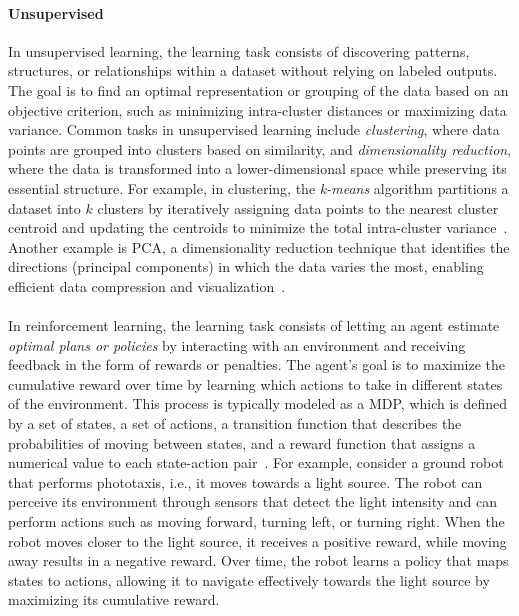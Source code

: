 \paragraph{Unsupervised}
%
In unsupervised learning, the learning task consists of discovering patterns, structures, or relationships within a dataset without relying on labeled outputs.
%
The goal is to find an optimal representation or grouping of the data based on an objective criterion, such as minimizing intra-cluster distances or maximizing data variance.
%
Common tasks in unsupervised learning include \emph{clustering}, where data points are grouped into clusters based on similarity, and \emph{dimensionality reduction}, where the data is transformed into a lower-dimensional space while preserving its essential structure.
%
For example, in clustering, the \emph{k-means} algorithm partitions a dataset into \(k\) clusters by iteratively assigning data points to the nearest cluster centroid and updating the centroids to minimize the total intra-cluster variance~\cite{lloyd1982least}.
%
Another example is \gls{PCA}, a dimensionality reduction technique that identifies the directions (principal components) in which the data varies the most, enabling efficient data compression and visualization~\cite{pearson1901lines}.


\paragraph{}
%
In reinforcement learning, the learning task consists of letting an agent estimate \emph{optimal plans or policies} by interacting with an environment and receiving feedback in the form of rewards or penalties.
%
The agent's goal is to maximize the cumulative reward over time by learning which actions to take in different states of the environment.
%
This process is typically modeled as a \gls{MDP}, which is defined by a set of states, a set of actions, a transition function that describes the probabilities of moving between states, and a reward function that assigns a numerical value to each state-action pair~\cite{DBLP:books/lib/SuttonB98}.
%
For example, consider a ground robot that performs phototaxis, i.e., it moves towards a light source.
%
The robot can perceive its environment through sensors that detect the light intensity and can perform actions such as moving forward, turning left, or turning right.
%
When the robot moves closer to the light source, it receives a positive reward, while moving away results in a negative reward.
%
Over time, the robot learns a policy that maps states to actions, allowing it to navigate effectively towards the light source by maximizing its cumulative reward.

